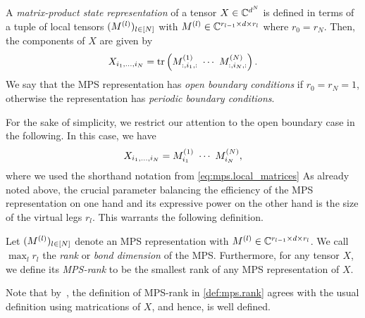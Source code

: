 \begin{definition}%
  \label{def:mps.mps}
  A \emph{matrix-product state representation} of a tensor $X \in {\mathbb{C}}^{d^N}$ is defined in terms of a tuple of local tensors $(M^{(l)})_{l \in [N]}$ with $M^{(l)} \in {\mathbb{C}}^{r_{l - 1} \times d \times r_l}$ where $r_0 = r_N$.
  Then, the components of $X$ are given by
  \[
    \label{eq:mps.periodic_boundary}
    X_{i_1,\ldots,i_N} = \tr \left( M\ind{1}_{:,i_1,:}\ \cdots\  M\ind{N}_{:,i_N,:} \right).
  \]
  We say that the MPS representation has \emph{open boundary conditions} if $r_0 = r_N = 1$, otherwise the representation has \emph{periodic boundary conditions}.
\end{definition}

For the sake of simplicity, we restrict our attention to the open boundary case in the following.
In this case, we have
\[
  \label{eq:mps.open_boundary}
  X_{i_1,\ldots,i_N} = M^{(1)}_{i_1}\ \cdots\  M^{(N)}_{i_N},
\]
where we used the shorthand notation from \cref{eq:mps.local_matrices}
As already noted above, the crucial parameter balancing the efficiency of the MPS representation on one hand and its expressive power on the other hand is the size of the virtual legs $r_l$.
This warrants the following definition.

\begin{definition}%
  \label{def:mps.rank}
  Let $(M^{(l)})_{l \in [N]}$ denote an MPS representation with $M^{(l)} \in {\mathbb{C}}^{r_{l - 1} \times d \times r_l}$.
  We call $\max_l r_l$ the \emph{rank} or \emph{bond dimension} of the MPS.
  Furthermore, for any tensor $X$, we define its \emph{MPS-rank} to be the smallest rank of any MPS representation of $X$.
\end{definition}

Note that by~\cite[Thm.\ 2.2]{Oseledets_2011_TensorTrain}, the definition of MPS-rank in \cref{def:mps.rank} agrees with the usual definition using matrications of $X$, and hence, is well defined.\\


